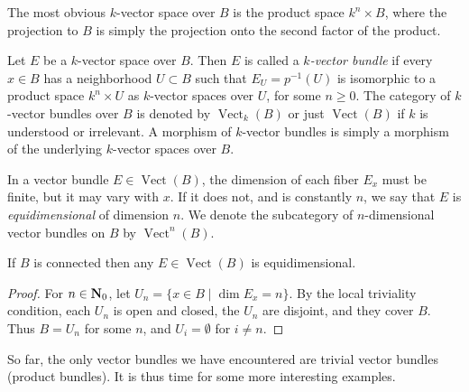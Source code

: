 \documentclass[a4paper,openany]{scrbook}
\DeclareMathOperator{\Vect}{Vect}
\begin{document}
The most obvious $k$-vector space over $B$ is the product space $k^n \times B$, where the projection to $B$ is simply the projection onto the second factor of the product.
\begin{defn}
Let $E$ be a $k$-vector space over $B$. Then $E$ is called a \emph{$k$-vector bundle} if every $x \in B$ has a neighborhood $U \subset B$ such that $E_U = p^{-1}(U)$ is isomorphic to a product space $k^n \times U$ as $k$-vector spaces over $U$, for some $n \geq 0$. The category of $k$-vector bundles over $B$ is denoted by $\Vect_k(B)$ or just $\Vect(B)$ if $k$ is understood or irrelevant. A morphism of $k$-vector bundles is simply a morphism of the underlying $k$-vector spaces over $B$.
\end{defn}



In a vector bundle $E \in \Vect(B)$, the dimension of each fiber $E_x$ must be finite, but it may vary with $x$. If it does not, and is constantly $n$, we say that $E$ is \emph{equidimensional} of dimension $n$. We denote the subcategory of $n$-dimensional vector bundles on $B$ by $\Vect^n(B)$.

\begin{lemma}
If $B$ is connected then any $E \in \Vect(B)$ is equidimensional.
\end{lemma}
\begin{proof}
For $n \in \mathbf{N}_0$, let $U_n = \{ x \in B \mid \dim E_x = n\}$. By the local triviality condition, each $U_n$ is open and closed, the $U_n$ are disjoint, and they cover $B$. Thus $B=U_n$ for some $n$, and $U_i = \emptyset$ for $i \neq n$.
\end{proof}

So far, the only vector bundles we have encountered are trivial vector bundles (product bundles). It is thus time for some more interesting examples.
\end{document}
